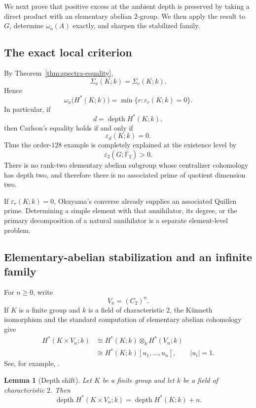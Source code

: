\documentclass[11pt]{amsart}
\newtheorem{lemma}[theorem]{Lemma}
\theoremstyle{definition}
\theoremstyle{remark}
\DeclareMathOperator{\depth}{depth}
\newcommand{\kbar}{\overline{\mathbb F}_{2}}
\begin{document}
We next prove that positive excess at the ambient depth is preserved by taking a direct product with an elementary abelian $2$-group.  We then apply the result to $G$, determine $\omega_a(A)$ exactly, and sharpen the stabilized family.

\subsection{The exact local criterion}

By Theorem~\ref{thm:spectra-equality},
\[
\Sigma_a(K;k)=\Sigma_c(K;k).
\]
Hence
\[
\omega_a\bigl(H^*(K;k)\bigr)
=\min\{r:\varepsilon_r(K;k)=0\}.
\]
In particular, if
\[
d=\depth H^*(K;k),
\]
then Carlson's equality holds if and only if
\[
\varepsilon_d(K;k)=0.
\]
Thus the order-$128$ example is completely explained at the existence level by
\[
\varepsilon_2(G;\kbar)>0.
\]
There is no rank-two elementary abelian subgroup whose centralizer cohomology has depth two, and therefore there is no associated prime of quotient dimension two.

If $\varepsilon_r(K;k)=0$, Okuyama's converse already supplies an associated Quillen prime.  Determining a simple element with that annihilator, its degree, or the primary decomposition of a natural annihilator is a separate element-level problem.

\subsection{Elementary-abelian stabilization and an infinite family}

For $n\geq0$, write
\[
V_n=(C_2)^n.
\]
If $K$ is a finite group and $k$ is a field of characteristic $2$, the K\"unneth isomorphism and the standard computation of elementary abelian cohomology give
\begin{equation}
\label{eq:kunneth-polynomial}
\begin{aligned}
H^*(K\times V_n;k)
&\cong H^*(K;k)\otimes_kH^*(V_n;k)\\
&\cong H^*(K;k)[u_1,\dots,u_n],
\qquad |u_i|=1.
\end{aligned}
\end{equation}
See, for example, \cite[Chapter~V]{Brown1982}.

\begin{lemma}[Depth shift]
\label{lem:depth-shift}
Let $K$ be a finite group and let $k$ be a field of characteristic $2$.  Then
\[
\depth H^*(K\times V_n;k)=\depth H^*(K;k)+n.
\]
\end{lemma}
\end{document}
